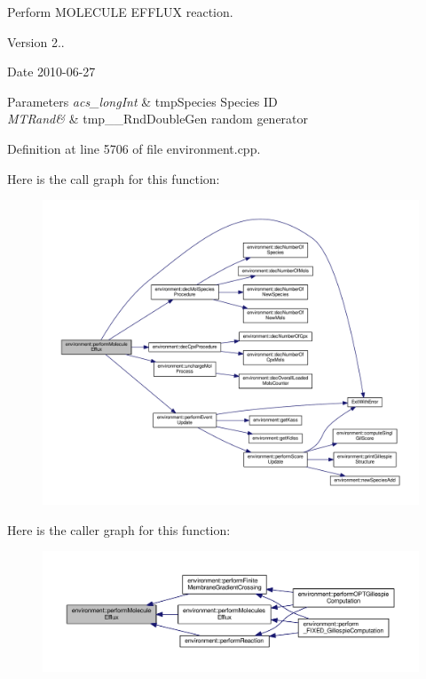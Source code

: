 Perform M\-O\-L\-E\-C\-U\-L\-E E\-F\-F\-L\-U\-X reaction. 

\begin{DoxyVersion}{Version}
2.. 
\end{DoxyVersion}
\begin{DoxyDate}{Date}
2010-\/06-\/27 
\end{DoxyDate}

\begin{DoxyParams}{Parameters}
{\em acs\-\_\-long\-Int} & tmp\-Species Species I\-D \\
\hline
{\em M\-T\-Rand\&} & tmp\-\_\-\-\_\-\-Rnd\-Double\-Gen random generator \\
\hline
\end{DoxyParams}


Definition at line 5706 of file environment.\-cpp.



Here is the call graph for this function\-:\nopagebreak
\begin{figure}[H]
\begin{center}
\leavevmode
\includegraphics[width=350pt]{a00003_ad072a40a7d9521379c7ff50ed8110fbe_cgraph}
\end{center}
\end{figure}




Here is the caller graph for this function\-:\nopagebreak
\begin{figure}[H]
\begin{center}
\leavevmode
\includegraphics[width=350pt]{a00003_ad072a40a7d9521379c7ff50ed8110fbe_icgraph}
\end{center}
\end{figure}



